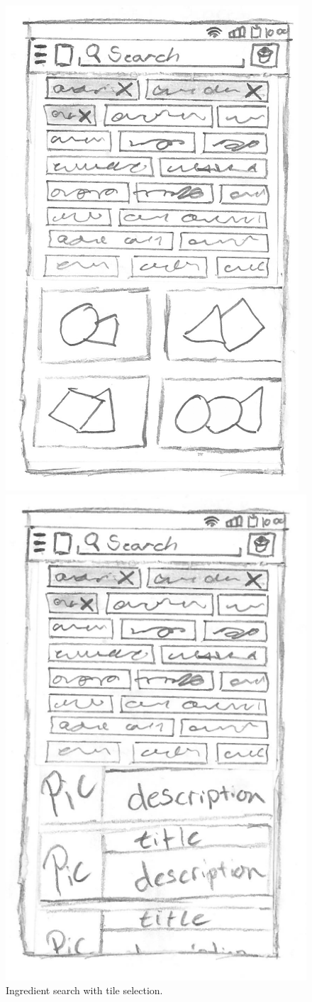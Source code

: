 \begin{figure}[H]
\begin{minipage}[b]{0.5\columnwidth}
\centering
\includegraphics[width=0.7\columnwidth]{img/prototypes/ingredient_search_tile.pdf}
\caption{Ingredient search with tile selection\label{fig:ingreani}.}
\end{minipage}
\hspace{0.5cm}
\begin{minipage}[b]{0.5\columnwidth}
\centering
\includegraphics[width=0.72\columnwidth]{img/prototypes/recipe_browse.pdf}

\end{minipage}
\end{figure}
